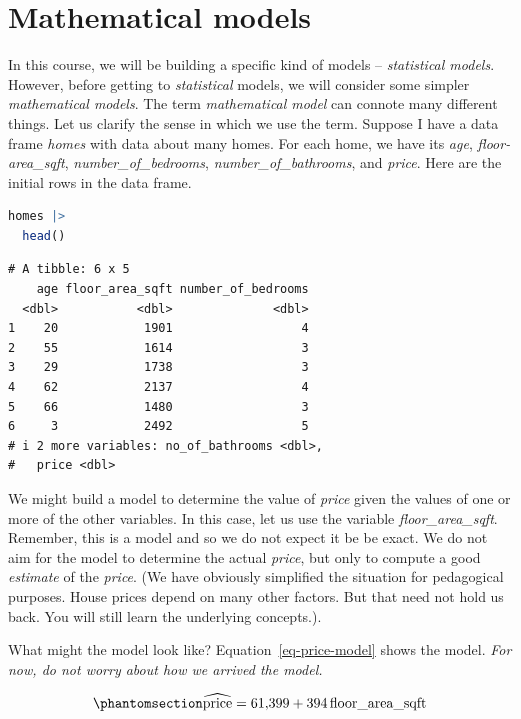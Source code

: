 \documentclass[
  12pt,
  letterpaper,
  DIV=11,
  numbers=noendperiod]{scrreprt}
\begin{document}
\section{Mathematical models}\label{mathematical-models}

In this course, we will be building a specific kind of models --
\emph{statistical models}. However, before getting to \emph{statistical}
models, we will consider some simpler \emph{mathematical models}. The
term \emph{mathematical model} can connote many different things. Let us
clarify the sense in which we use the term. Suppose I have a data frame
\emph{homes} with data about many homes. For each home, we have its
\emph{age}, \emph{floor-area\_sqft}, \emph{number\_of\_bedrooms},
\emph{number\_of\_bathrooms}, and \emph{price}. Here are the initial
rows in the data frame.

\begin{lstlisting}[language=R]
homes |> 
  head()
\end{lstlisting}

\begin{lstlisting}
# A tibble: 6 x 5
    age floor_area_sqft number_of_bedrooms
  <dbl>           <dbl>              <dbl>
1    20            1901                  4
2    55            1614                  3
3    29            1738                  3
4    62            2137                  4
5    66            1480                  3
6     3            2492                  5
# i 2 more variables: no_of_bathrooms <dbl>,
#   price <dbl>
\end{lstlisting}

We might build a model to determine the value of \emph{price} given the
values of one or more of the other variables. In this case, let us use
the variable \emph{floor\_area\_sqft}. Remember, this is a model and so
we do not expect it be be exact. We do not aim for the model to
determine the actual \emph{price}, but only to compute a good
\emph{estimate} of the \emph{price}. (We have obviously simplified the
situation for pedagogical purposes. House prices depend on many other
factors. But that need not hold us back. You will still learn the
underlying concepts.).

What might the model look like? Equation~\ref{eq-price-model} shows the
model. \emph{For now, do not worry about how we arrived the model.}

\begin{equation}\phantomsection\label{eq-price-model}{
\widehat{\text{price}} = 61{,}399 + 394\,\text{floor\_area\_sqft}
}\end{equation}
\end{document}
